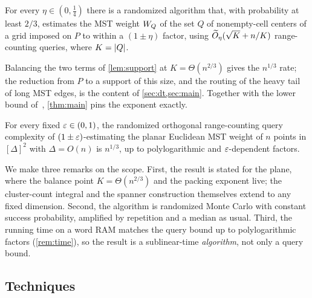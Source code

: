 \begin{lemma*}
For every $\eta\in(0,\tfrac14)$ there is a randomized algorithm that, with probability at least $2/3$,
estimates the MST weight $W_Q$ of the set $Q$ of nonempty-cell centers of a grid imposed on $P$ to within
a $(1\pm\eta)$ factor, using $\widetilde{O}_\eta(\sqrt K+n/K)$ range-counting queries, where $K=\left|Q\right|$.
\end{lemma*}

Balancing the two terms of \cref{lem:support} at $K=\Theta(n^{2/3})$ gives the $n^{1/3}$ rate; the
reduction from $P$ to a support of this size, and the routing of the heavy tail of long MST edges, is the
content of \cref{sec:dt,sec:main}. Together with the lower bound of~\cite{DMOSW25}, \cref{thm:main} pins
the exponent exactly.

\begin{corollary*}
For every fixed $\varepsilon\in(0,1)$, the randomized orthogonal range-counting query complexity of
$(1\pm\varepsilon)$-estimating the planar Euclidean MST weight of $n$ points in $[\Delta]^2$ with $\Delta=O(n)$ is
$n^{1/3}$, up to polylogarithmic and $\varepsilon$-dependent factors.
\end{corollary*}

We make three remarks on the scope. First, the result is stated for the plane, where the balance point
$K=\Theta(n^{2/3})$ and the packing exponent live; the cluster-count integral and the spanner construction
themselves extend to any fixed dimension. Second, the algorithm is randomized
Monte Carlo with constant success probability, amplified by repetition and a median as usual. Third, the
running time on a word RAM matches the query bound up to polylogarithmic factors (\cref{rem:time}), so the
result is a sublinear-time \emph{algorithm}, not only a query bound.

\subsection{Techniques}\label{sec:intro-tech}

